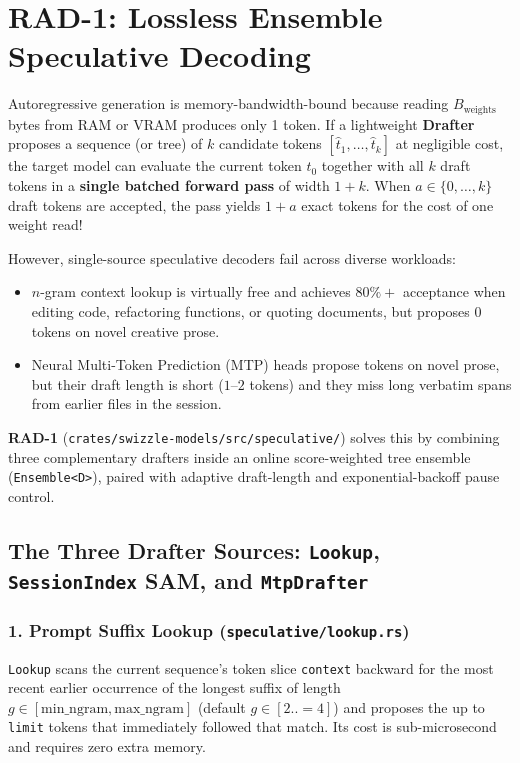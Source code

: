 \documentclass[10pt,a4paper]{article}
\theoremstyle{swzstyle}
\newcommand{\code}[1]{\texttt{#1}}
\begin{document}
\section{RAD-1: Lossless Ensemble Speculative Decoding}

Autoregressive generation is memory-bandwidth-bound because reading $B_{\text{weights}}$ bytes from RAM or VRAM produces only 1 token. If a lightweight \textbf{Drafter} proposes a sequence (or tree) of $k$ candidate tokens $[\hat{t}_1, \dots, \hat{t}_k]$ at negligible cost, the target model can evaluate the current token $t_0$ together with all $k$ draft tokens in a \textbf{single batched forward pass} of width $1 + k$. When $a \in \{0, \dots, k\}$ draft tokens are accepted, the pass yields $1 + a$ exact tokens for the cost of one weight read!

However, single-source speculative decoders fail across diverse workloads:
\begin{itemize}
  \item $n$-gram context lookup is virtually free and achieves $80\%+$ acceptance when editing code, refactoring functions, or quoting documents, but proposes 0 tokens on novel creative prose.
  \item Neural Multi-Token Prediction (MTP) heads propose tokens on novel prose, but their draft length is short ($1\text{--}2$ tokens) and they miss long verbatim spans from earlier files in the session.
\end{itemize}

\textbf{RAD-1} (\code{crates/swizzle-models/src/speculative/}) solves this by combining three complementary drafters inside an online score-weighted tree ensemble (\code{Ensemble<D>}), paired with adaptive draft-length and exponential-backoff pause control.

\subsection{The Three Drafter Sources: \texttt{Lookup}, \texttt{SessionIndex} SAM, and \texttt{MtpDrafter}}

\subsubsection{1. Prompt Suffix Lookup (\texttt{speculative/lookup.rs})}
\code{Lookup} scans the current sequence's token slice \code{context} backward for the most recent earlier occurrence of the longest suffix of length $g \in [\text{min\_ngram}, \text{max\_ngram}]$ (default $g \in [2..=4]$) and proposes the up to \code{limit} tokens that immediately followed that match. Its cost is sub-microsecond and requires zero extra memory.
\end{document}
